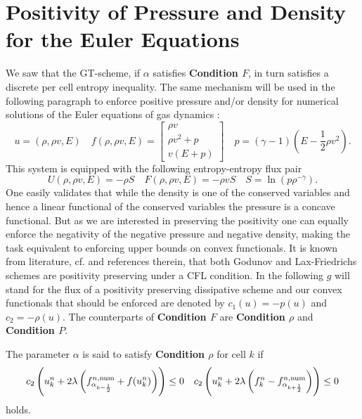 \section{Positivity of Pressure and Density  for the Euler Equations}\label{se_phys_cons}
We saw that the GT-scheme, if $\alpha$ satisfies \textbf{Condition $F$}, in turn satisfies a discrete per cell entropy inequality. The same mechanism will be used in the following paragraph to enforce positive pressure and/or density for numerical solutions of the Euler equations of gas dynamics \cite{Harten83b}:
\begin{equation}
	\label{eq:Euler}
	u =(\rho, \rho v, E) 
\quad f(\rho, \rho v, E) = \begin{bmatrix} \rho v \\ \rho v^2 + p\\ v(E + p) \end{bmatrix} 
\quad p = (\gamma - 1)\left (E - \frac 1 2 \rho v^2 \right).
\end{equation}
	This system is equipped with the following entropy-entropy flux pair 
\begin{equation} \label{eq:EulerPE}
U(\rho, \rho v, E) = - \rho S  \quad F(\rho, \rho v, E) = - \rho v S \quad S = \ln(p \rho^{- \gamma}).
\end{equation}
One easily validates that while the density is one of the conserved variables and hence a linear functional of the conserved variables the pressure is a concave functional. 
But as we are interested in preserving the positivity one can equally enforce the negativity of the negative pressure and negative density, making the task equivalent to enforcing upper bounds on convex functionals. It is known from literature, cf.  \cite{zhang2011maximum} and references therein, that  both  Godunov and Lax-Friedrichs schemes are positivity preserving under a CFL condition. In the following $g$ will stand for the flux of a positivity preserving dissipative scheme and our convex functionals that should be enforced are denoted by $c_1(u) = -p(u)$ and $c_2 = -\rho(u)$. The counterparts of \textbf{Condition $F$} are \textbf{Condition $\rho$} and \textbf{Condition $P$}.
\begin{definition}
	The parameter $\alpha$ is said to satisfy \textbf{Condition $\rho$} for cell $k$ if 
	\[
		\begin{aligned}
	c_2\left (u^n_k + 2\lambda \left(	f^{n, \mathrm{num}}_{\alpha_{k-\frac 1 2}} + f(u^n_k)\right)  \right) \leq 0 \quad
	 c_2\left (u^n_k + 2\lambda \left( f^n_{k} - f^{n, \mathrm{num}}_{\alpha_{k+\frac 1 2}}\right)  \right) \leq 0
		\end{aligned}
	\]
	holds.
\end{definition}


